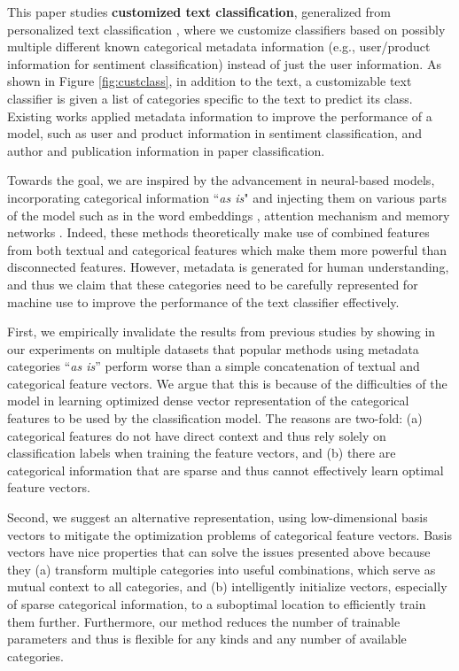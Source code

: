 \documentclass[11pt,a4paper]{article}
\begin{document}
This paper studies \textbf{customized text classification}, generalized from personalized text classification \cite{baruzzo2009general}, where we customize classifiers based on possibly multiple different known categorical metadata information (e.g., user/product information for sentiment classification) instead of just the user information. As shown in Figure \ref{fig:custclass}, in addition to the text, a customizable text classifier is given a list of categories specific to the text to predict its class. Existing works applied metadata information to improve the performance of a model, such as user and product \cite{tang2015learning} information in sentiment classification, and author \cite{rosen2004author} and publication \cite{joorabchi2011unsupervised} information in paper classification.

Towards the goal, we are inspired by the advancement in neural-based models, incorporating categorical information ``\textit{as is}" and injecting them on various parts of the model such as in the word embeddings \cite{tang2015learning}, attention mechanism \cite{chen2016neural,amplayo2018cold} and memory networks \cite{dou2017capturing}. Indeed, these methods theoretically make use of combined features from both textual and categorical features which make them more powerful than disconnected features. However, metadata is generated for human understanding, and thus we claim that these categories need to be carefully represented for machine use to improve the performance of the text classifier effectively.

First, we empirically invalidate the results from previous studies by showing in our experiments on multiple datasets that popular methods using metadata categories ``\textit{as is}'' perform worse than a simple concatenation of textual and categorical feature vectors. We argue that this is because of the difficulties of the model in learning optimized dense vector representation of the categorical features to be used by the classification model. The reasons are two-fold: (a) categorical features do not have direct context and thus rely solely on classification labels when training the feature vectors, and (b) there are categorical information that are sparse and thus cannot effectively learn optimal feature vectors.

Second, we suggest an alternative representation, using low-dimensional basis vectors to mitigate the optimization problems of categorical feature vectors. Basis vectors have nice properties that can solve the issues presented above because they (a) transform multiple categories into useful combinations, which serve as mutual context to all categories, and (b) intelligently initialize vectors, especially of sparse categorical information, to a suboptimal location to efficiently train them further. Furthermore, our method reduces the number of trainable parameters and thus is flexible for any kinds and any number of available categories.
\end{document}
